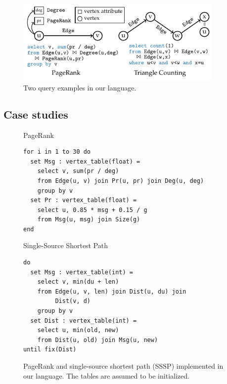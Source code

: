 \documentclass{sokendai_thesis} %
\begin{document}
\begin{figure}
\includegraphics[width=0.9\textwidth]{figures/syntax-example.pdf}
\vspace{-3ex}
\caption{Two query examples in our language.}
\label{fig:join-syntax}
\vspace{-2ex}
\end{figure}

\subsection{Case studies}
\label{sec:algorithms}

\begin{figure}
PageRank
\begin{lstlisting}[language=sql-graph,frame=single]
for i in 1 to 30 do
  set Msg : vertex_table(float) =
    select v, sum(pr / deg)
    from Edge(u, v) join Pr(u, pr) join Deg(u, deg)
    group by v
  set Pr : vertex_table(float) =
    select u, 0.85 * msg + 0.15 / g
    from Msg(u, msg) join Size(g)
end
\end{lstlisting}
Single-Source Shortest Path
\begin{lstlisting}[language=sql-graph,frame=single]
do
  set Msg : vertex_table(int) =
    select v, min(du + len)
    from Edge(u, v, len) join Dist(u, du) join
         Dist(v, d)
    group by v
  set Dist : vertex_table(int) =
    select u, min(old, new)
    from Dist(u, old) join Msg(u, new)
until fix(Dist)
\end{lstlisting}
\caption{PageRank and single-source shortest path (SSSP) implemented in our language. The tables are assumed to be initialized.}
\label{fig:algorithms}
\vspace{-5pt}
\end{figure}
\end{document}
